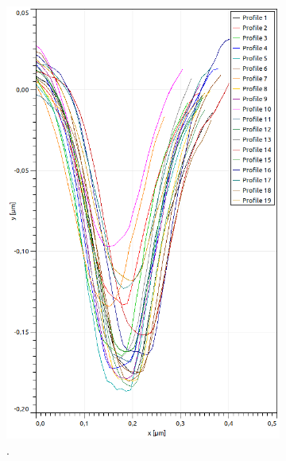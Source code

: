 \begin{figure}[H]
\begin{subfigure}[t]{0.3\textwidth}
	\includegraphics[width=\textwidth]{AFM_auswertung/dvd_tiefe_grafik.png}
	\caption{.}
	\label{abb:}
	\end{subfigure}
	~
	\begin{subfigure}[t]{0.3\textwidth}

\end{subfigure}
\end{figure}
